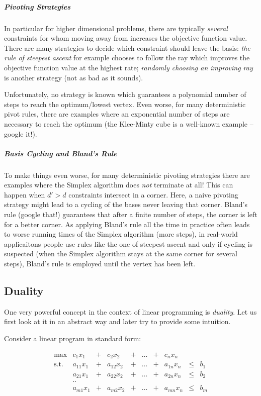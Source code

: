 \documentclass{article}
\begin{document}
\subparagraph*{Pivoting Strategies}
In particular for higher dimensional problems, there are typically \emph{several} constraints for whom moving away from increases the objective function value. There are many strategies to decide which constraint should leave the basis: \emph{the rule of steepest ascent} for example chooses to follow the ray which improves the objective function value at the highest rate; \emph{randomly choosing an improving ray} is another strategy (not as bad as it sounds).

Unfortunately, no strategy is known which guarantees a polynomial number of steps to reach the optimum/lowest vertex. Even worse, for many deterministic pivot rules, there are examples where an exponential number of steps are necessary to reach the optimum (the Klee-Minty cube is a well-known example -- google it!).

\subparagraph*{Basis Cycling and Bland's Rule}

To make things even worse, for many deterministic pivoting strategies there are examples where the Simplex algorithm does \emph{not} terminate at all! This can happen when $d'>d$ constraints intersect in a corner. Here, a naive pivoting strategy might lead to a cycling of the bases never leaving that corner. Bland's rule (google that!) guarantees that after a finite number of steps, the corner is left for a better corner. As applying Bland's rule all the time in practice often leads to worse running times of the Simplex algorithm (more steps), in real-world applicaitons people use rules like the one of steepest ascent and only if cycling is suspected (when the Simplex algorithm stays at the same corner for several steps), Bland's rule is employed until the vertex has been left.

\subsection{Duality}
One very powerful concept in the context of linear programming is \emph{duality}. Let us first look at it in an abstract way and later try to provide some intuition.

Consider a linear program in standard form:

\[
\begin{matrix}
	\max	& c_1 x_1 &+& c_2 x_2 &+& \dots &+& c_n x_n&&\\  
	\mbox{s.t.}	& a_{11} x_1 &+& a_{12} x_2&+& \dots &+&a_{1n} x_n&\leq&b_1\\
			& a_{21} x_1 &+& a_{22} x_2&+& \dots &+&a_{2n} x_n&\leq&b_2\\
			& ..	&&&&&&&&\\
			& a_{m1} x_1 &+& a_{m2} x_2&+& \dots &+&a_{mn} x_n&\leq&b_m\\
\end{matrix}
\]
\end{document}
